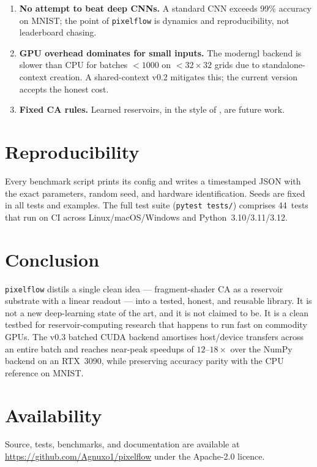 \documentclass[11pt,a4paper]{article}
\begin{document}
\begin{enumerate}
    \item \textbf{No attempt to beat deep CNNs.} A standard CNN exceeds 99\%
    accuracy on MNIST; the point of \texttt{pixelflow} is dynamics and
    reproducibility, not leaderboard chasing.
    \item \textbf{GPU overhead dominates for small inputs.} The moderngl
    backend is slower than CPU for batches $< 1000$ on $< 32{\times}32$
    grids due to standalone-context creation. A shared-context v0.2 mitigates
    this; the current version accepts the honest cost.
    \item \textbf{Fixed CA rules.} Learned reservoirs, in the style of
    \citet{mordvintsev2020}, are future work.
\end{enumerate}

\section{Reproducibility}

Every benchmark script prints its config and writes a timestamped JSON with
the exact parameters, random seed, and hardware identification. Seeds are
fixed in all tests and examples. The full test suite
(\texttt{pytest tests/}) comprises 44~tests that run on CI across
Linux/macOS/Windows and Python~3.10/3.11/3.12.

\section{Conclusion}

\texttt{pixelflow} distils a single clean idea --- fragment-shader CA as a
reservoir substrate with a linear readout --- into a tested, honest, and
reusable library. It is not a new deep-learning state of the art, and it is
not claimed to be. It is a clean testbed for reservoir-computing research
that happens to run fast on commodity GPUs. The v0.3 batched CUDA backend
amortises host/device transfers across an entire batch and reaches
near-peak speedups of $12$--$18\times$ over the NumPy backend on an RTX~3090,
while preserving accuracy parity with the CPU reference on MNIST.

\section*{Availability}

Source, tests, benchmarks, and documentation are available at
\url{https://github.com/Agnuxo1/pixelflow} under the Apache-2.0 licence.
\end{document}
